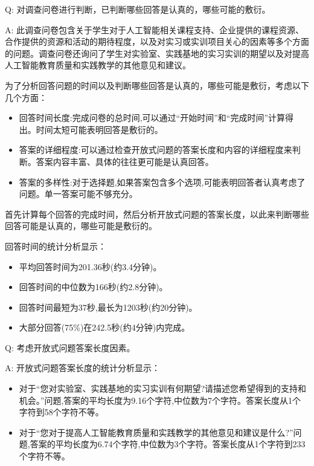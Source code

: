 
Q:
  对调查问卷进行判断，已判断哪些回答是认真的，哪些可能的敷衍。

A:
  此调查问卷包含关于学生对于人工智能相关课程支持、企业提供的课程资源、合作提供的资源和活动的期待程度，以及对实习或实训项目关心的因素等多个方面的问题。调查问卷还询问了学生对实验室、实践基地的实习实训的期望以及对提高人工智能教育质量和实践教学的其他意见和建议。

为了分析回答问题的时间以及判断哪些回答是认真的，哪些可能是敷衍，考虑以下几个方面：

\begin{itemize}
\item 回答时间长度:完成问卷的总时间,可以通过“开始时间”和“完成时间”计算得出。时间太短可能表明回答是敷衍的。

\item 答案的详细程度:可以通过检查开放式问题的答案长度和内容的详细程度来判断。答案内容丰富、具体的往往更可能是认真回答。

\item 答案的多样性:对于选择题,如果答案包含多个选项,可能表明回答者认真考虑了问题。单一答案可能不够充分。
\end{itemize}

首先计算每个回答的完成时间，然后分析开放式问题的答案长度，以此来判断哪些回答可能是认真的，哪些可能是敷衍的。

回答时间的统计分析显示：

\begin{itemize}

\item 平均回答时间为201.36秒(约3.4分钟)。
\item 回答时间的中位数为166秒(约2.8分钟)。

\item 回答时间最短为37秒,最长为1203秒(约20分钟)。
\item 大部分回答(75\%)在242.5秒(约4分钟)内完成。
\end{itemize}

Q:
考虑开放式问题答案长度因素。

A:
开放式问题答案长度的统计分析显示：

\begin{itemize}
\item 对于“您对实验室、实践基地的实习实训有何期望?请描述您希望得到的支持和机会。”问题,答案的平均长度为9.16个字符,中位数为7个字符。答案长度从1个字符到58个字符不等。

\item 对于“您对于提高人工智能教育质量和实践教学的其他意见和建议是什么?”问题,答案的平均长度为6.74个字符,中位数为3个字符。答案长度从1个字符到233个字符不等。

\end{itemize}

